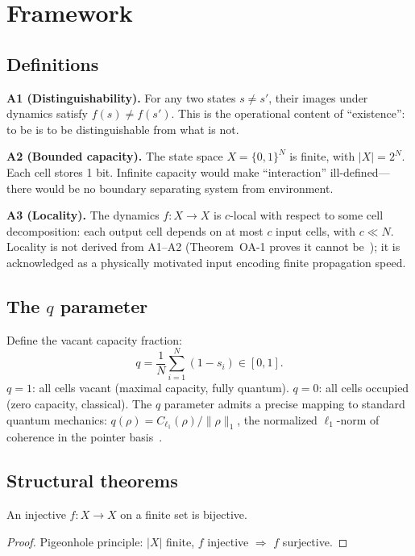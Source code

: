 \documentclass[reprint]{revtex4-2}
\begin{document}
\section{Framework}

\subsection{Definitions}

\textbf{A1 (Distinguishability).} For any two states $s\neq s'$, their images under dynamics satisfy $f(s)\neq f(s')$. This is the operational content of ``existence'': to be is to be distinguishable from what is not.

\textbf{A2 (Bounded capacity).} The state space $X=\{0,1\}^N$ is finite, with $|X|=2^N$. Each cell stores 1 bit. Infinite capacity would make ``interaction'' ill-defined---there would be no boundary separating system from environment.

\textbf{A3 (Locality).} The dynamics $f:X\to X$ is $c$-local with respect to some cell decomposition: each output cell depends on at most $c$ input cells, with $c\ll N$. Locality is not derived from A1--A2 (Theorem~OA-1 proves it cannot be~\cite{A4_analysis}); it is acknowledged as a physically motivated input encoding finite propagation speed.

\subsection{The $q$ parameter}

Define the vacant capacity fraction:
\begin{equation}
q = \frac{1}{N}\sum_{i=1}^N (1-s_i) \in [0,1].
\end{equation}
$q=1$: all cells vacant (maximal capacity, fully quantum). $q=0$: all cells occupied (zero capacity, classical). The $q$ parameter admits a precise mapping to standard quantum mechanics: $q(\rho) = C_{\ell_1}(\rho)/\|\rho\|_1$, the normalized $\ell_1$-norm of coherence in the pointer basis~\cite{Baumgratz2014}.

\subsection{Structural theorems}

\begin{theorem}[Bijectivity]
An injective $f:X\to X$ on a finite set is bijective.
\end{theorem}
\begin{proof}
Pigeonhole principle: $|X|$ finite, $f$ injective $\Rightarrow$ $f$ surjective.
\end{proof}
\end{document}
